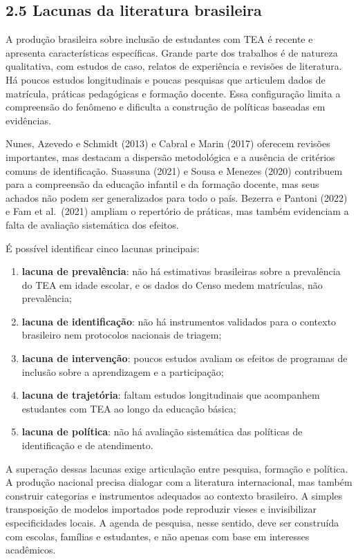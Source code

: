 \subsection{2.5 Lacunas da literatura
brasileira}\label{lacunas-da-literatura-brasileira}

A produção brasileira sobre inclusão de estudantes com TEA é recente e
apresenta características específicas. Grande parte dos trabalhos é de
natureza qualitativa, com estudos de caso, relatos de experiência e
revisões de literatura. Há poucos estudos longitudinais e poucas
pesquisas que articulem dados de matrícula, práticas pedagógicas e
formação docente. Essa configuração limita a compreensão do fenômeno e
dificulta a construção de políticas baseadas em evidências.

Nunes, Azevedo e Schmidt (2013) e Cabral e Marin (2017) oferecem
revisões importantes, mas destacam a dispersão metodológica e a ausência
de critérios comuns de identificação. Suassuna (2021) e Sousa e Menezes
(2020) contribuem para a compreensão da educação infantil e da formação
docente, mas seus achados não podem ser generalizados para todo o país.
Bezerra e Pantoni (2022) e Fam et al.~(2021) ampliam o repertório de
práticas, mas também evidenciam a falta de avaliação sistemática dos
efeitos.

É possível identificar cinco lacunas principais:

\begin{enumerate}
\def\labelenumi{\alph{enumi})}
\item
  \textbf{lacuna de prevalência}: não há estimativas brasileiras sobre a
  prevalência do TEA em idade escolar, e os dados do Censo medem
  matrículas, não prevalência;
\item
  \textbf{lacuna de identificação}: não há instrumentos validados para o
  contexto brasileiro nem protocolos nacionais de triagem;
\item
  \textbf{lacuna de intervenção}: poucos estudos avaliam os efeitos de
  programas de inclusão sobre a aprendizagem e a participação;
\item
  \textbf{lacuna de trajetória}: faltam estudos longitudinais que
  acompanhem estudantes com TEA ao longo da educação básica;
\item
  \textbf{lacuna de política}: não há avaliação sistemática das
  políticas de identificação e de atendimento.
\end{enumerate}

A superação dessas lacunas exige articulação entre pesquisa, formação e
política. A produção nacional precisa dialogar com a literatura
internacional, mas também construir categorias e instrumentos adequados
ao contexto brasileiro. A simples transposição de modelos importados
pode reproduzir vieses e invisibilizar especificidades locais. A agenda
de pesquisa, nesse sentido, deve ser construída com escolas, famílias e
estudantes, e não apenas com base em interesses acadêmicos.

